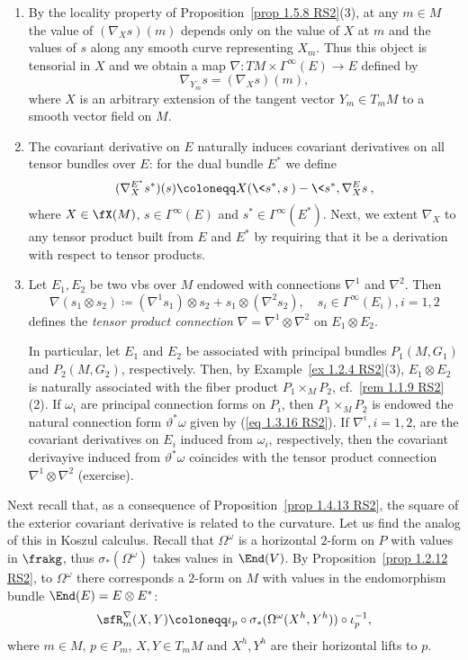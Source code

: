 \begin{rem}\label{rem 1.5.9 RS2}
    \begin{enumerate}
        \item By the locality property of Proposition~\ref{prop 1.5.8 RS2}(3), at any $m\in M$ the value of $(\nabla_X s)(m)$ depends only on the value of $X$ at $m$ and the values of $s$ along any smooth curve representing $X_m$. Thus this object is tensorial in $X$ and we obtain a map $\nabla:TM\times\Gamma^\infty(E)\to E$ defined by
        \[\nabla_{Y_m}s=(\nabla_X s)(m),\]
        where $X$ is an arbitrary extension of the tangent vector $Y_m\in T_mM$ to a smooth vector field on $M$.
        \item The covariant derivative on $E$ naturally induces covariant derivatives on all tensor bundles over $E$: for the dual bundle $E^\ast$ we define
        \[(\nabla^{E^\ast}_X s^\ast)(s)\coloneqq X(\<s^\ast,s\>)-\<s^\ast,\nabla_X^E s\>,\]
        where $X\in\fX(M)$, $s\in\Gamma^\infty(E)$ and $s^\ast\in\Gamma^\infty(E^\ast)$. Next, we extent $\nabla_X$ to any tensor product built from $E$ and $E^\ast$ by requiring that it be a derivation with respect to tensor products.
        \item Let $E_1,E_2$ be two \glspl{vb} over $M$ endowed with connections $\nabla^1$ and $\nabla^2$. Then
        \[\nabla(s_1\otimes s_2)\coloneqq (\nabla^1 s_1)\otimes s_2+s_1\otimes (\nabla^2 s_2), \quad s_i\in\Gamma^\infty(E_i),i=1,2\]
        defines the \emph{tensor product connection} $\nabla=\nabla^1\otimes\nabla^2$ on $E_1\otimes E_2$.

        In particular, let $E_1$ and $E_2$ be associated with principal bundles $P_1(M,G_1)$ and $P_2(M,G_2)$, respectively. Then, by Example~\ref{ex 1.2.4 RS2}(3), $E_1\otimes E_2$ is naturally associated with the fiber product $P_1\times_M P_2$, cf.\ \ref{rem 1.1.9 RS2}(2). If $\omega_i$ are principal connection forms on $P_i$, then $P_1\times_M P_2$ is endowed the natural connection form $\vartheta^\ast\omega$ given by (\ref{eq 1.3.16 RS2}). If $\nabla^i,i=1,2$, are the covariant derivatives on $E_i$ induced from $\omega_i$, respectively, then the covariant derivayive induced from $\vartheta^\ast\omega$ coincides with the tensor product connection $\nabla^1\otimes \nabla^2$ (exercise).
    \end{enumerate}
\end{rem}

Next recall that, as a consequence of Proposition~\ref{prop 1.4.13 RS2}, the square of the exterior covariant derivative is related to the curvature. Let us find the analog of this in Koszul calculus. Recall that $\Omega^\omega$ is a horizontal $2$-form on $P$ with values in $\frakg$, thus $\sigma_\ast(\Omega^\omega)$ takes values in $\End(V)$. By Proposition~\ref{prop 1.2.12 RS2}, to $\Omega^\omega$ there corresponds a $2$-form on $M$ with values in the endomorphism bundle $\End(E)=E\otimes E^\ast$:
\[\sfR^\nabla_m(X,Y)\coloneqq \iota_p\circ \sigma_\ast(\Omega^\omega(X^h,Y^h))\circ\iota_p^{-1},\label{eq def Rnabla}\]
where $m\in M$, $p\in P_m$, $X,Y\in T_mM$ and $X^h,Y^h$ are their horizontal lifts to $p$.

